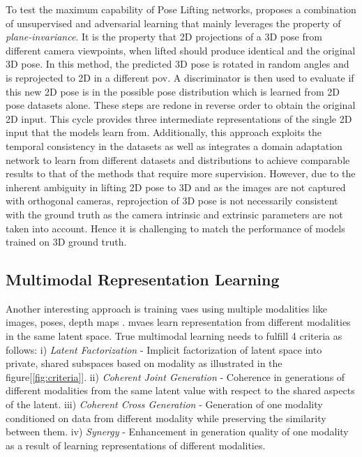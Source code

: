 To test the maximum capability of Pose Lifting networks, \cite{amazon1} proposes a combination of unsupervised and adversarial learning that mainly leverages the property of \textit{plane-invariance}. It is the property that 2D projections of a 3D pose from different camera viewpoints, when lifted should produce identical and the original 3D pose. In this method, the predicted 3D pose is rotated in random angles and is reprojected to 2D in a different \ac{pov}. A discriminator is then used to evaluate if this new 2D pose is in the possible pose distribution which is learned from 2D pose datasets alone. These steps are redone in reverse order to obtain the original 2D input. This cycle provides three intermediate representations of the single 2D input that the models learn from. Additionally, this approach exploits the temporal consistency in the datasets as well as integrates a domain adaptation network to learn from different datasets and distributions to achieve comparable results to that of the methods that require more supervision. However, due to the inherent ambiguity in lifting 2D pose to 3D and as the images are not captured with orthogonal cameras, reprojection of 3D pose is not necessarily consistent with the ground truth as the camera intrinsic and extrinsic parameters are not taken into account. Hence it is challenging to match the performance of models trained on 3D ground truth.

\subsection{Multimodal Representation Learning}
\label{subsec:multimodal_representation_learning}

Another interesting approach is training \ac{vae}s using multiple modalities like images, poses, depth maps \cite{CrossingNets, crossmodal, MMVAE, HandDisentangled}. \ac{mvae}s learn representation from different modalities in the same latent space. True multimodal learning needs to fulfill 4 criteria as follows: i) \textit{Latent Factorization} - Implicit factorization of latent space into private, shared subspaces based on modality as illustrated in the figure[\ref{fig:criteria}]. ii) \textit{Coherent Joint Generation} - Coherence in generations of different modalities from the same latent value with respect to the shared aspects of the latent. iii) \textit{Coherent Cross Generation} - Generation of one modality conditioned on data from different modality while preserving the similarity between them. iv) \textit{Synergy} - Enhancement in generation quality of one modality as a result of learning representations of different modalities.

